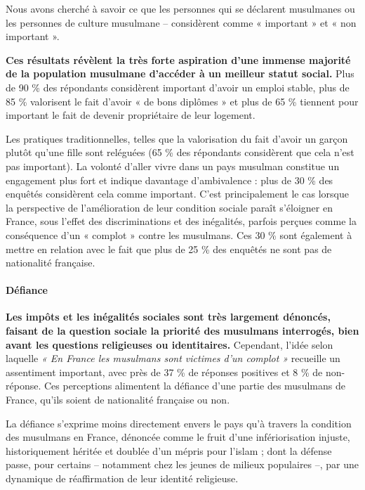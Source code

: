 Nous avons cherché à savoir ce que les personnes qui se déclarent
musulmanes
  ou les personnes de culture musulmane -- considèrent comme « important
  » et
« non important ».

\textbf{Ces résultats révèlent la très forte aspiration d'une immense
majorité de la population musulmane d'accéder à un meilleur statut
social.} Plus de 90 \% des répondants considèrent important d'avoir un
emploi stable, plus de 85 \% valorisent le fait d'avoir « de bons
diplômes » et plus de 65 \% tiennent pour important le fait de devenir
propriétaire de leur logement.

Les pratiques traditionnelles, telles que la valorisation du fait
d'avoir un garçon plutôt qu'une fille sont reléguées (65 \% des
répondants considèrent que cela n'est pas important). La volonté d'aller
vivre dans un pays musulman constitue un engagement plus fort et indique
davantage d'ambivalence : plus de 30 \% des enquêtés considèrent cela
comme important. C'est principalement le cas lorsque la perspective de
l'amélioration de leur condition sociale paraît s'éloigner en France,
sous l'effet des discriminations et des inégalités, parfois perçues
comme la conséquence d'un « complot » contre les musulmans. Ces 30 \%
sont également
à mettre en relation avec le fait que plus de 25 \% des enquêtés ne sont
pas de nationalité française.

\paragraph{Défiance}


\textbf{Les impôts et les inégalités sociales sont très largement
dénoncés, faisant de la question sociale la priorité des musulmans
interrogés, bien avant les questions religieuses ou identitaires.}
Cependant, l'idée selon laquelle \emph{« En France les musulmans sont
victimes d'un complot »} recueille un assentiment important, avec près
de 37 \% de réponses positives et 8 \% de non-réponse. Ces perceptions
alimentent la défiance d'une partie des musulmans de France, qu'ils
soient de nationalité française ou non.

La défiance s'exprime moins directement envers le pays qu'à travers la
condition des musulmans en France, dénoncée comme le fruit d'une
infériorisation injuste, historiquement héritée et doublée d'un mépris
pour l'islam ; dont la défense passe, pour certains -- notamment chez
les jeunes de milieux populaires --, par une dynamique de réaffirmation
de leur identité religieuse.

